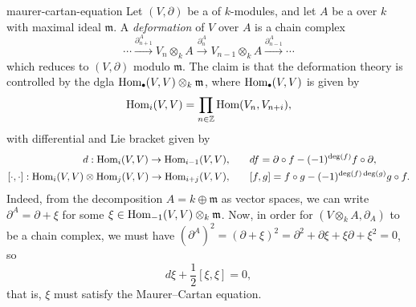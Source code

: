 \begin{example}{maurer-cartan-equation}
    Let $(V, \partial)$ be a  of $k$-modules, and let $A$ be a   over $k$ with maximal ideal $\mathfrak{m}$. A \textit{deformation} of $V$ over $A$ is a chain complex
    \[ \cdots \xrightarrow{\partial^A_{n + 1}} V_n \otimes_k A \xrightarrow{\partial^A_n} V_{n - 1} \otimes_k A \xrightarrow{\partial^A_{n - 1}} \cdots \]
    which reduces to $(V, \partial)$ modulo $\mathfrak{m}$. The claim is that the deformation theory is controlled by the dgla $\Hom_\bdot(V, V) \otimes_k \mathfrak{m}$, where $\Hom_\bdot(V, V)$ is given by
    \[ \text{Hom}_i(V, V) = \prod_{n \in \mathbb{Z}} \text{Hom}(V_n, V_{n + i}) , \]
    with differential and Lie bracket given by
    \[ \begin{aligned}
        d : \text{Hom}_i(V, V) \to \text{Hom}_{i - 1}(V, V), &\qquad df = \partial \circ f - (-1)^{\deg(f)} f \circ \partial , \\
        [ \cdot, \cdot ] : \text{Hom}_i(V, V) \otimes \text{Hom}_j(V, V) \to \text{Hom}_{i + j}(V, V), &\qquad [f, g] = f \circ g - (-1)^{\deg(f) \deg(g)} g \circ f .
    \end{aligned} \]
    Indeed, from the decomposition $A = k \oplus \mathfrak{m}$ as vector spaces, we can write $\partial^A = \partial + \xi$ for some $\xi \in \text{Hom}_{-1}(V, V) \otimes_k \mathfrak{m}$. Now, in order for $(V \otimes_k A, \partial_A)$ to be a chain complex, we must have $(\partial^A)^2 = (\partial + \xi)^2 = \partial^2 + \partial \xi + \xi \partial + \xi^2 = 0$, so
    \[ d \xi + \frac{1}{2} [\xi, \xi] = 0 , \]
    that is, $\xi$ must satisfy the Maurer--Cartan equation.
\end{example}
